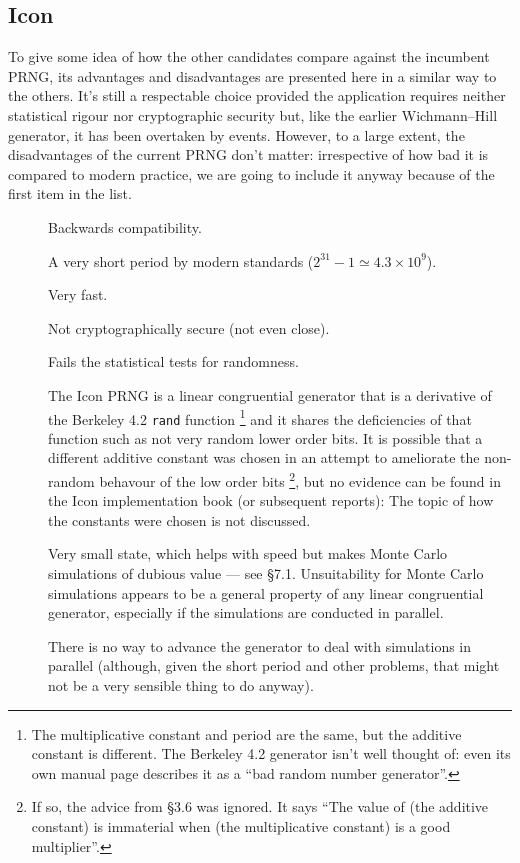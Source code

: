 \documentclass[letterpaper,12pt]{article}
\begin{document}
\subsection{Icon}
To give some idea of how the other candidates compare against the incumbent
PRNG, its advantages and disadvantages are presented here in a similar way
to the others. It's still a respectable choice provided the application
requires neither statistical rigour nor cryptographic security but, like
the earlier Wichmann--Hill generator\cite{WichmannHill:1982}, it has been
overtaken by events.  However, to a large extent, the disadvantages of the
current PRNG don't matter: irrespective of how bad it is compared to modern
practice, we are going to include it anyway because of the first item in
the list.
\begin{description}
\item[\GoodThing]
  Backwards compatibility.
\item[\BadThing]
  A very short period by modern standards
  ($2^{31} - 1  \simeq 4.3 \times 10^{9}$).
\item[\GoodThing]
  Very fast.
\item[\PossiblyBadThing]
  Not cryptographically secure (not even close).
\item[\BadThing]
  Fails the statistical tests for randomness.
\item[\PossiblyBadThing]
  The Icon PRNG is a linear congruential generator that is a derivative of
  the Berkeley 4.2 \texttt{rand} function%
  \footnote{
   The multiplicative constant and period are the same, but the additive
   constant is different. The Berkeley 4.2 generator isn't well thought of:
   even its own manual page describes it as a ``bad random number generator''.
  }
  and it shares the deficiencies of that function such as not very random
  lower order bits. It is possible that a different additive constant was
  chosen in an attempt to ameliorate the non-random behavour of the low
  order bits%
  \footnote{
    If so, the advice from \cite{Knuth:SemiNumerical2}
    \S 3.6 was ignored. It says ``The value of (the additive constant) is
    immaterial when (the multiplicative constant) is a good multiplier''.
  }, but no evidence can be found in the Icon implementation
  book\cite{IconImplementationBook} (or subsequent reports): The topic of
  how the constants were chosen is not discussed.
  
\item[\BadThing] Very small state, which helps with speed but makes
  Monte Carlo simulations of dubious value --- see
  \cite{PressEtAl:numericalRecipes} \S 7.1. Unsuitability for Monte Carlo
  simulations appears to be a general property of any linear congruential
  generator, especially if the simulations are conducted in
  parallel\cite{ParkAndMiller}.
\item[\PossiblyBadThing]
  There is no way to advance the generator to deal with simulations in
  parallel (although, given the short period and other problems, that might
  not be a very sensible thing to do anyway).
\end{description}
\end{document}
